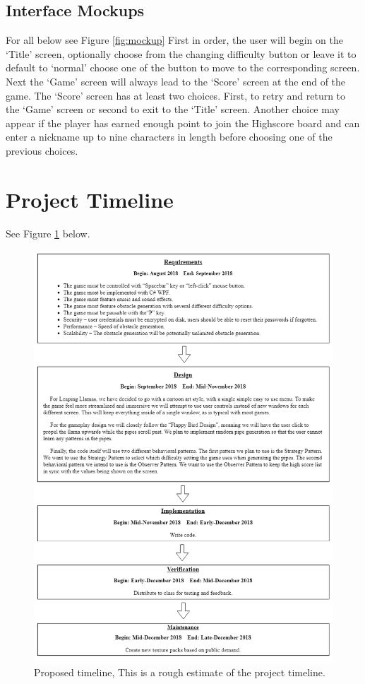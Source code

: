 \documentclass[10pt,conference,onecolumn,compsoc]{IEEEtran}
\begin{document}
\subsection{Interface Mockups}
For all below see Figure \ref{fig:mockup}
First in order, the user will begin on the `Title' screen, optionally choose from the changing difficulty button or leave it to default to `normal' choose one of the button to move to the corresponding screen. Next the `Game' screen will always lead to the `Score' screen at the end of the game. The `Score' screen has at least two choices. First, to retry and return to the `Game' screen or second to exit to the `Title' screen. Another choice may appear if the player has earned enough point to join the Highscore board and can enter a nickname up to nine characters in length before choosing one of the previous choices.

\section{Project Timeline}
See Figure \ref{fig:timeline} below.
\begin{figure}[ht!]
\includegraphics[scale=0.5]{ProposalTimeline.png}
\caption{Proposed timeline, This is a rough estimate of the project timeline.}
\label{fig:timeline}
\end{figure}
\end{document}
